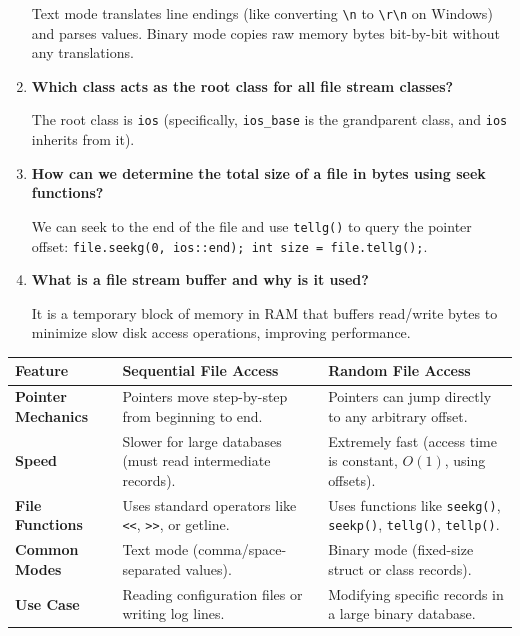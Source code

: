 \documentclass[12pt,a4paper]{article}
\newcommand{\Q}[1]{\textbf{#1}\par\noindent\ignorespaces}
\renewcommand{\arraystretch}{1.45}
\begin{document}
\begin{tcolorbox}[exambox, title={\textbf{Frequently Asked / Viva Questions}}]
\begin{enumerate}[topsep=0pt, label=\textbf{Q\arabic*.}, itemsep=5pt]
    Text mode translates line endings (like converting \texttt{\textbackslash n} to \texttt{\textbackslash r\textbackslash n} on Windows) and parses values. Binary mode copies raw memory bytes bit-by-bit without any translations.
  \item \Q{Which class acts as the root class for all file stream classes?}
    The root class is \texttt{ios} (specifically, \texttt{ios\_base} is the grandparent class, and \texttt{ios} inherits from it).
  \item \Q{How can we determine the total size of a file in bytes using seek functions?}
    We can seek to the end of the file and use \texttt{tellg()} to query the pointer offset:
    \texttt{file.seekg(0, ios::end); int size = file.tellg();}.
  \item \Q{What is a file stream buffer and why is it used?}
    It is a temporary block of memory in RAM that buffers read/write bytes to minimize slow disk access operations, improving performance.
\end{enumerate}
\end{tcolorbox}

\begin{tcolorbox}[tikzbox, title={Comparison: Sequential File Access vs. Random File Access}]
\renewcommand{\arraystretch}{1.45}
\par\noindent
\begin{tabularx}{\linewidth}{|B{3.2cm}|Y|Y|}
\hline
\textbf{Feature} & \textbf{\color{myteal}Sequential File Access} & \textbf{\color{myamber}Random File Access} \\
\hline
\textbf{Pointer Mechanics} & Pointers move step-by-step from beginning to end. & Pointers can jump directly to any arbitrary offset. \\
\hline
\textbf{Speed} & Slower for large databases (must read intermediate records). & Extremely fast (access time is constant, $O(1)$, using offsets). \\
\hline
\textbf{File Functions} & Uses standard operators like \texttt{<<}, \texttt{>>}, or getline. & Uses functions like \texttt{seekg()}, \texttt{seekp()}, \texttt{tellg()}, \texttt{tellp()}. \\
\hline
\textbf{Common Modes} & Text mode (comma/space-separated values). & Binary mode (fixed-size struct or class records). \\
\hline
\textbf{Use Case} & Reading configuration files or writing log lines. & Modifying specific records in a large binary database. \\
\hline
\end{tabularx}
\end{tcolorbox}
\end{document}
